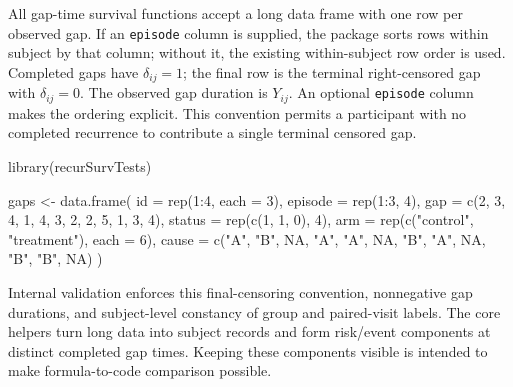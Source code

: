 \documentclass[
  12pt]{article}
\newenvironment{Shaded}{\begin{snugshade}}{\end{snugshade}}
\newcommand{\AttributeTok}[1]{\textcolor[rgb]{0.40,0.45,0.13}{#1}}
\newcommand{\ConstantTok}[1]{\textcolor[rgb]{0.56,0.35,0.01}{#1}}
\newcommand{\DecValTok}[1]{\textcolor[rgb]{0.68,0.00,0.00}{#1}}
\newcommand{\FunctionTok}[1]{\textcolor[rgb]{0.28,0.35,0.67}{#1}}
\newcommand{\NormalTok}[1]{\textcolor[rgb]{0.00,0.23,0.31}{#1}}
\newcommand{\OtherTok}[1]{\textcolor[rgb]{0.00,0.23,0.31}{#1}}
\newcommand{\SpecialCharTok}[1]{\textcolor[rgb]{0.37,0.37,0.37}{#1}}
\newcommand{\StringTok}[1]{\textcolor[rgb]{0.13,0.47,0.30}{#1}}
\begin{document}
All gap-time survival functions accept a long data frame with one row
per observed gap. If an \texttt{episode} column is supplied, the package
sorts rows within subject by that column; without it, the existing
within-subject row order is used. Completed gaps have \(\delta_{ij}=1\);
the final row is the terminal right-censored gap with \(\delta_{ij}=0\).
The observed gap duration is \(Y_{ij}\). An optional \texttt{episode}
column makes the ordering explicit. This convention permits a
participant with no completed recurrence to contribute a single terminal
censored gap.

\begin{Shaded}
\begin{Highlighting}[]
\FunctionTok{library}\NormalTok{(recurSurvTests)}

\NormalTok{gaps }\OtherTok{\textless{}{-}} \FunctionTok{data.frame}\NormalTok{(}
  \AttributeTok{id =} \FunctionTok{rep}\NormalTok{(}\DecValTok{1}\SpecialCharTok{:}\DecValTok{4}\NormalTok{, }\AttributeTok{each =} \DecValTok{3}\NormalTok{),}
  \AttributeTok{episode =} \FunctionTok{rep}\NormalTok{(}\DecValTok{1}\SpecialCharTok{:}\DecValTok{3}\NormalTok{, }\DecValTok{4}\NormalTok{),}
  \AttributeTok{gap =} \FunctionTok{c}\NormalTok{(}\DecValTok{2}\NormalTok{, }\DecValTok{3}\NormalTok{, }\DecValTok{4}\NormalTok{, }\DecValTok{1}\NormalTok{, }\DecValTok{4}\NormalTok{, }\DecValTok{3}\NormalTok{, }\DecValTok{2}\NormalTok{, }\DecValTok{2}\NormalTok{, }\DecValTok{5}\NormalTok{, }\DecValTok{1}\NormalTok{, }\DecValTok{3}\NormalTok{, }\DecValTok{4}\NormalTok{),}
  \AttributeTok{status =} \FunctionTok{rep}\NormalTok{(}\FunctionTok{c}\NormalTok{(}\DecValTok{1}\NormalTok{, }\DecValTok{1}\NormalTok{, }\DecValTok{0}\NormalTok{), }\DecValTok{4}\NormalTok{),}
  \AttributeTok{arm =} \FunctionTok{rep}\NormalTok{(}\FunctionTok{c}\NormalTok{(}\StringTok{"control"}\NormalTok{, }\StringTok{"treatment"}\NormalTok{), }\AttributeTok{each =} \DecValTok{6}\NormalTok{),}
  \AttributeTok{cause =} \FunctionTok{c}\NormalTok{(}\StringTok{"A"}\NormalTok{, }\StringTok{"B"}\NormalTok{, }\ConstantTok{NA}\NormalTok{, }\StringTok{"A"}\NormalTok{, }\StringTok{"A"}\NormalTok{, }\ConstantTok{NA}\NormalTok{, }\StringTok{"B"}\NormalTok{, }\StringTok{"A"}\NormalTok{, }\ConstantTok{NA}\NormalTok{, }\StringTok{"B"}\NormalTok{, }\StringTok{"B"}\NormalTok{, }\ConstantTok{NA}\NormalTok{)}
\NormalTok{)}
\end{Highlighting}
\end{Shaded}

Internal validation enforces this final-censoring convention,
nonnegative gap durations, and subject-level constancy of group and
paired-visit labels. The core helpers turn long data into subject
records and form risk/event components at distinct completed gap times.
Keeping these components visible is intended to make formula-to-code
comparison possible.
\end{document}
